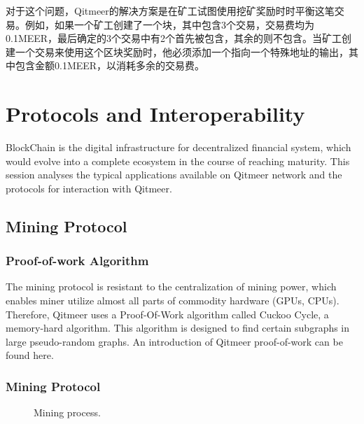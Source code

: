 \documentclass[a4paper,11pt]{article}
\begin{document}
对于这个问题，Qitmeer的解决方案是在矿工试图使用挖矿奖励时时平衡这笔交易。例如，如果一个矿工创建了一个块，其中包含3个交易，交易费均为0.1MEER，最后确定的3个交易中有2个首先被包含，其余的则不包含。当矿工创建一个交易来使用这个区块奖励时，他必须添加一个指向一个特殊地址的输出，其中包含金额0.1MEER，以消耗多余的交易费。

\section{Protocols and Interoperability}
BlockChain is the digital infrastructure for decentralized financial system, which would evolve into a complete ecosystem in the course of reaching maturity. This session analyses the typical applications available on  Qitmeer network and the protocols for interaction with Qitmeer. 

\subsection{Mining Protocol}
\subsubsection{Proof-of-work Algorithm}

The mining protocol is resistant to the centralization of mining power, which enables miner utilize almost all parts of commodity hardware (GPUs, CPUs).
Therefore, Qitmeer uses a Proof-Of-Work algorithm called Cuckoo Cycle\cite{cuckoocycle},
a memory-hard algorithm. This algorithm is designed to find certain subgraphs in large pseudo-random graphs.
An introduction of Qitmeer proof-of-work can be found here.\cite{qitmeerpow}

\subsubsection{Mining Protocol}

\begin{figure}[ht]
	\centerline{%
	}
	\caption{Mining process.}
\end{figure}
\end{document}
